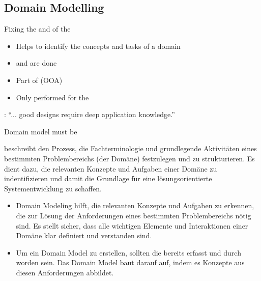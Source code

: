 \subsection{Domain Modelling}
\begin{defBox}[title=Domain Modelling]
    Fixing the  and  of the 
    \begin{itemize}
        \item {} Helps to identify the  concepts and tasks of a domain
        \item {}  and  are done
        \item {} Part of  (OOA)
        \item {} Only performed for the 
    \end{itemize}
\end{defBox}
: \enquote{... good designs require deep application knowledge.}
\begin{defBox}
    Domain model must be 
\end{defBox}
\begin{infoBox}
     beschreibt den Prozess, die Fachterminologie und grundlegende Aktivitäten eines bestimmten Problembereichs (der Domäne) festzulegen und zu strukturieren. Es dient dazu, die relevanten Konzepte und Aufgaben einer Domäne zu indentifizieren und damit die Grundlage für eine lösungsorientierte Systementwicklung zu schaffen.
\end{infoBox}

\begin{infoBox}[title=Warum Domain Modeling?]
    \begin{itemize}
        \item {} Domain Modeling hilft, die relevanten Konzepte und Aufgaben zu erkennen, die zur Lösung der Anforderungen eines bestimmten Problembereichs nötig sind. Es stellt sicher, dass alle wichtigen Elemente und Interaktionen einer Domäne klar definiert und verstanden sind.
        \item {} Um ein Domain Model zu erstellen, sollten die  bereits erfasst und durch  worden sein. Das Domain Model baut darauf auf, indem es Konzepte aus diesen Anforderungen abbildet.
    \end{itemize}
\end{infoBox}

